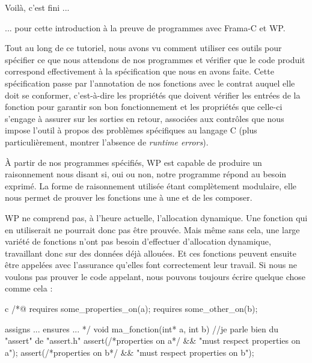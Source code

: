 \begin{Quotation}
Voilà, c'est fini ...
\end{Quotation}



... pour cette introduction à la preuve de programmes avec Frama-C et WP.



Tout au long de ce tutoriel, nous avons vu comment utiliser ces outils
pour spécifier ce que nous attendons de nos programmes et vérifier que le code
produit correspond effectivement à la spécification que nous en
avons faite. Cette spécification passe par l'annotation de nos fonctions avec
le contrat auquel elle doit se conformer, c'est-à-dire les propriétés que
doivent vérifier les entrées de la fonction pour garantir son bon fonctionnement
et les propriétés que celle-ci s'engage à assurer sur les sorties en retour,
associées aux contrôles que nous impose l'outil à propos des problèmes
spécifiques au langage C (plus particulièrement, montrer l'absence de
\textit{runtime errors}).



À partir de nos programmes spécifiés, WP est capable de produire un
raisonnement nous disant si, oui ou non, notre programme répond au besoin
exprimé. La forme de raisonnement utilisée étant complètement modulaire, elle
nous permet de prouver les fonctions une à une et de les composer.

WP ne  comprend pas, à l'heure actuelle, l'allocation dynamique. Une fonction
qui en  utiliserait ne pourrait donc pas être prouvée. Mais même sans cela,
une large variété de fonctions n'ont pas besoin
d'effectuer d'allocation dynamique, travaillant donc sur des données déjà
allouées. Et ces fonctions peuvent ensuite être appelées avec l'assurance
qu'elles font correctement leur travail. Si nous ne voulons pas prouver le
code appelant, nous pouvons toujours écrire quelque chose comme cela :



\begin{CodeBlock}{c}
/*@
  requires some_properties_on(a);
  requires some_other_on(b);

  assigns ...
  ensures ...
*/
void ma_fonction(int* a, int b){
  //je parle bien du "assert" de "assert.h"
  assert(/*properties on a*/ && "must respect properties on a");
  assert(/*properties on b*/ && "must respect properties on b");
}
\end{CodeBlock}



